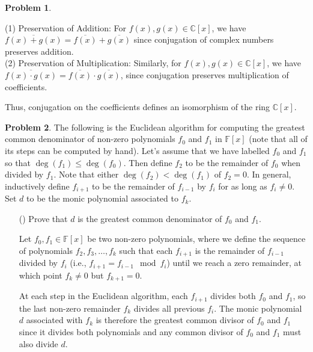 \documentclass[12pt]{article}
\theoremstyle{definition}
\newtheorem{problem}{Problem}
\newcounter{subq}[problem]
\newenvironment{subproblem}
{\refstepcounter{subq} \begin{itemize} \item[(\alph{subq})]}
{\end{itemize} \medskip}
\begin{document}
\begin{problem}
\begin{solution}
        (1) Preservation of Addition: For \( f(x), g(x) \in \mathbb{C}[x] \), we have \( \overline{f(x) + g(x)} = \overline{f(x)} + \overline{g(x)} \) since conjugation of complex numbers preserves addition.\\
        (2) Preservation of Multiplication: Similarly, for \( f(x), g(x) \in \mathbb{C}[x] \), we have \( \overline{f(x) \cdot g(x)} = \overline{f(x)} \cdot \overline{g(x)} \), since conjugation preserves multiplication of coefficients.

        Thus, conjugation on the coefficients defines an isomorphism of the ring \( \mathbb{C}[x] \).
    \end{solution}
\end{problem}

\begin{problem}
    The following is the Euclidean algorithm for computing the greatest common denominator of non-zero polynomials $f_0$ and $f_1$
    in $\mathbb{F}[x]$ (note that all of its steps can be computed by hand). Let's assume that we have labelled $f_0$ and $f_1$ so
    that $\deg(f_1) \leq \deg(f_0)$. Then define $f_2$ to be the remainder of $f_0$ when divided by $f_1$. Note that either 
    $\deg(f_2) < \deg(f_1)$ of $f_2 = 0$. In general, inductively define $f_{i+1}$ to be the remainder of $f_{i-1}$ by $f_i$ for
    as long as $f_i \neq 0$. Set $d$ to be the monic polynomial associated to $f_k$.

    \begin{subproblem}
        Prove that $d$ is the greatest common denominator of $f_0$ and $f_1$.

        \begin{solution}
            Let $f_0, f_1 \in \mathbb{F}[x]$ be two non-zero polynomials, where we define the sequence of polynomials $f_2, f_3, \ldots, f_k$ such that each $f_{i+1}$ is the remainder of $f_{i-1}$ divided by $f_i$ (i.e., $f_{i+1} = f_{i-1} \mod f_i$) until we reach a zero remainder, at which point $f_k \neq 0$ but $f_{k+1} = 0$. 

            At each step in the Euclidean algorithm, each $f_{i+1}$ divides both $f_0$ and $f_1$, so the last non-zero remainder $f_k$ divides all previous $f_i$. The monic polynomial $d$ associated with $f_k$ is therefore the greatest common divisor of $f_0$ and $f_1$ since it divides both polynomials and any common divisor of $f_0$ and $f_1$ must also divide $d$.
        \end{solution}
    \end{subproblem}


\end{problem}
\end{document}
